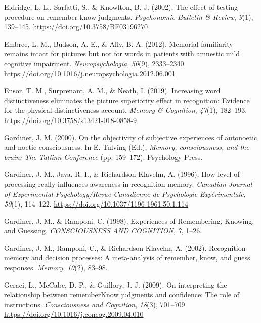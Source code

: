 \documentclass[
  11pt,
]{article}
\begin{document}
\leavevmode\hypertarget{ref-eldridge2002}{}%
Eldridge, L. L., Sarfatti, S., \& Knowlton, B. J. (2002). The effect of
testing procedure on remember-know judgments. \emph{Psychonomic Bulletin
\& Review}, \emph{9}(1), 139--145.
\url{https://doi.org/10.3758/BF03196270}

\leavevmode\hypertarget{ref-embree2012}{}%
Embree, L. M., Budson, A. E., \& Ally, B. A. (2012). Memorial
familiarity remains intact for pictures but not for words in patients
with amnestic mild cognitive impairment. \emph{Neuropsychologia},
\emph{50}(9), 2333--2340.
\url{https://doi.org/10.1016/j.neuropsychologia.2012.06.001}

\leavevmode\hypertarget{ref-ensor2019b}{}%
Ensor, T. M., Surprenant, A. M., \& Neath, I. (2019). Increasing word
distinctiveness eliminates the picture superiority effect in
recognition: Evidence for the physical-distinctiveness account.
\emph{Memory \& Cognition}, \emph{47}(1), 182--193.
\url{https://doi.org/10.3758/s13421-018-0858-9}

\leavevmode\hypertarget{ref-gardiner2000}{}%
Gardiner, J. M. (2000). On the objectivity of subjective experiences of
autonoetic and noetic consciousness. In E. Tulving (Ed.), \emph{Memory,
consciousness, and the brain: The Tallinn Conference} (pp. 159--172).
Psychology Press.

\leavevmode\hypertarget{ref-gardiner1996}{}%
Gardiner, J. M., Java, R. I., \& Richardson-Klavehn, A. (1996). How
level of processing really influences awareness in recognition memory.
\emph{Canadian Journal of Experimental Psychology/Revue Canadienne de
Psychologie Expérimentale}, \emph{50}(1), 114--122.
\url{https://doi.org/10.1037/1196-1961.50.1.114}

\leavevmode\hypertarget{ref-gardiner1998}{}%
Gardiner, J. M., \& Ramponi, C. (1998). Experiences of Remembering,
Knowing, and Guessing. \emph{CONSCIOUSNESS AND COGNITION}, \emph{7},
1--26.

\leavevmode\hypertarget{ref-gardiner2002a}{}%
Gardiner, J. M., Ramponi, C., \& Richardson-Klavehn, A. (2002).
Recognition memory and decision processes: A meta-analysis of remember,
know, and guess responses. \emph{Memory}, \emph{10}(2), 83--98.

\leavevmode\hypertarget{ref-geraci2009a}{}%
Geraci, L., McCabe, D. P., \& Guillory, J. J. (2009). On interpreting
the relationship between rememberKnow judgments and confidence: The role
of instructions. \emph{Consciousness and Cognition}, \emph{18}(3),
701--709. \url{https://doi.org/10.1016/j.concog.2009.04.010}
\end{document}
